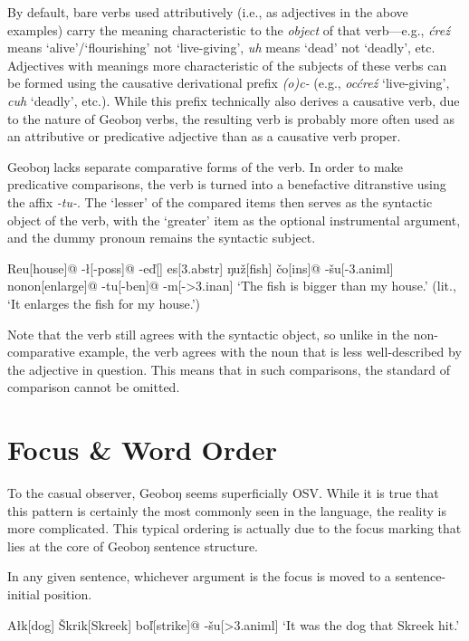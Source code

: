 \documentclass[a4paper,11pt,oneside,openany]{memoir}
\newcommand{\vd}{ď}
\newcommand{\vc}{č}
\newcommand{\vz}{ž}
\newcommand{\vs}{š}
\newcommand{\vl}{ľ}
\newcommand{\vS}{Š}
\newcommand{\engma}{ŋ}
\begin{document}
By default, bare verbs used attributively (i.e., as adjectives in the above examples) carry the meaning characteristic to the \textit{object} of that verb---e.g., \textit{\'cre\'z} means `alive'/`flourishing' not `live-giving', \textit{uh} means `dead' not `deadly', etc. Adjectives with meanings more characteristic of the subjects of these verbs can be formed using the causative derivational prefix \textit{(o)c-} (e.g., \textit{oc\'cre\'z} `live-giving', \textit{cuh} `deadly', etc.). While this prefix technically also derives a causative verb, due to the nature of Geobo{\engma} verbs, the resulting verb is probably more often used as an attributive or predicative adjective than as a causative verb proper. 

Geobo{\engma} lacks separate comparative forms of the verb. In order to make predicative comparisons, the verb is turned into a benefactive ditranstive using the affix \textit{-tu-}. The `lesser' of the compared items then serves as the syntactic object of the verb, with the `greater' item as the optional instrumental argument, and the dummy pronoun remains the syntactic subject.

\ex 
\begingl
Reu[house]@
-\l[\sc -poss]@
-e\vd[]
es[\sc 3.abstr]
\engma u\vz[fish] 
\vc o[\sc ins]@
-\vs u[\sc -3.animl]
nonon[enlarge]@
-tu[\sc -ben]@
-m[\sc ->3.inan]
\glft `The fish is bigger than my house.' (lit., `It enlarges the fish for my house.')
\endgl
\xe

Note that the verb still agrees with the syntactic object, so unlike in the non-comparative example, the verb agrees with the noun that is less well-described by the adjective in question. This means that in such comparisons, the standard of comparison cannot be omitted.

\section{Focus \& Word Order}\label{focus}

To the casual observer, Geobo{\engma} seems superficially OSV. While it is true that this pattern is certainly the most commonly seen in the language, the reality is more complicated. This typical ordering is actually due to the focus marking that lies at the core of Geobo{\engma} sentence structure.

In any given sentence, whichever argument is the focus is moved to a sentence-initial position. 

\ex
\begingl
A\l k[dog]
\vS krik[Skreek]
bo\vl[strike]@
-\vs u[{\sc >3.animl}]
\glft `It was the dog that Skreek hit.'
\endgl
\xe
\end{document}
